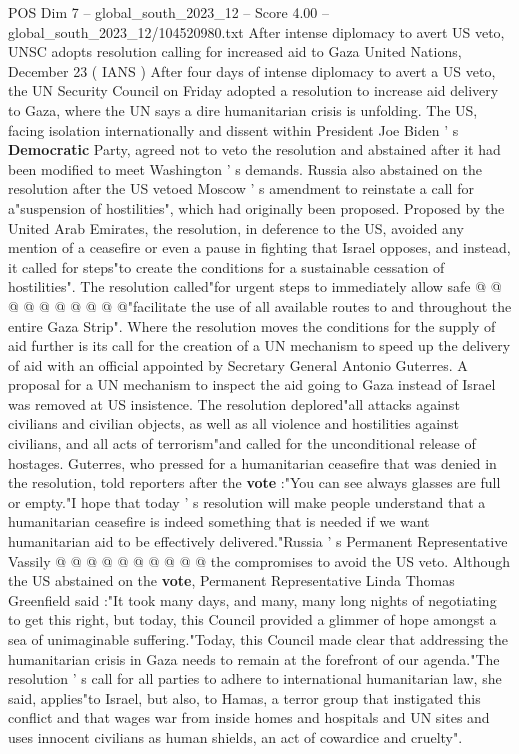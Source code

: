 \begin{textsample}{POS Dim 7 – global\_south\_2023\_12 – Score 4.00 – global\_south\_2023\_12/104520980.txt}  \label{ex:f7_pos_263}
After intense diplomacy to avert US veto, UNSC adopts resolution calling for increased aid to Gaza United Nations, December 23 ( IANS ) After four days of intense diplomacy to avert a US veto, the UN Security Council on Friday adopted a resolution to increase aid delivery to Gaza, where the UN says a dire humanitarian crisis is unfolding.
The US, facing isolation internationally and dissent within President Joe Biden ' s \textbf{Democratic} Party, agreed not to veto the resolution and abstained after it had been modified to meet Washington ' s demands.
Russia also abstained on the resolution after the US vetoed Moscow ' s amendment to reinstate a call for a"suspension of hostilities", which had originally been proposed.
Proposed by the United Arab Emirates, the resolution, in deference to the US, avoided any mention of a ceasefire or even a pause in fighting that Israel opposes, and instead, it called for steps"to create the conditions for a sustainable cessation of hostilities".
The resolution called"for urgent steps to immediately allow safe @ @ @ @ @ @ @ @ @ @"facilitate the use of all available routes to and throughout the entire Gaza Strip".
Where the resolution moves the conditions for the supply of aid further is its call for the creation of a UN mechanism to speed up the delivery of aid with an official appointed by Secretary General Antonio Guterres.
A proposal for a UN mechanism to inspect the aid going to Gaza instead of Israel was removed at US insistence.
The resolution deplored"all attacks against civilians and civilian objects, as well as all violence and hostilities against civilians, and all acts of terrorism"and called for the unconditional release of hostages.
Guterres, who pressed for a humanitarian ceasefire that was denied in the resolution, told reporters after the \textbf{vote} :"You can see always glasses are full or empty."I hope that today ' s resolution will make people understand that a humanitarian ceasefire is indeed something that is needed if we want humanitarian aid to be effectively delivered."Russia ' s Permanent Representative Vassily @ @ @ @ @ @ @ @ @ @ the compromises to avoid the US veto.
Although the US abstained on the \textbf{vote}, Permanent Representative Linda Thomas Greenfield said :"It took many days, and many, many long nights of negotiating to get this right, but today, this Council provided a glimmer of hope amongst a sea of unimaginable suffering."Today, this Council made clear that addressing the humanitarian crisis in Gaza needs to remain at the forefront of our agenda."The resolution ' s call for all parties to adhere to international humanitarian law, she said, applies"to Israel, but also, to Hamas, a terror group that instigated this conflict and that wages war from inside homes and hospitals and UN sites and uses innocent civilians as human shields, an act of cowardice and cruelty".

\end{textsample}
